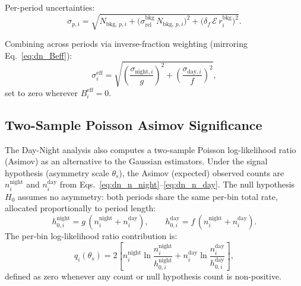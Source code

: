 \documentclass[12pt,a4paper]{article}
\newcommand{\Ecal}{\mathcal{E}}          %
\newcommand{\fd}{f}                      %
\newcommand{\fn}{g}                      %
\newcommand{\Beff}{B^{\mathrm{eff}}_{i}} %
\newcommand{\seff}{\sigma^{\mathrm{eff}}_{i}} %
\newcommand{\srel}{\sigma_{\mathrm{rel}}}
\begin{document}
Per-period uncertainties:
\begin{equation}
  \sigma_{p,i}
  = \sqrt{N_{\mathrm{bkg},\,p,i}
          + \bigl(\srel^{\mathrm{bkg}}\,N_{\mathrm{bkg},\,p,i}\bigr)^2
          + \bigl(\delta_f\,\Ecal\,r_i^{\mathrm{bkg}}\bigr)^2}.
  \label{eq:dn_sigma_period}
\end{equation}

Combining across periods via inverse-fraction weighting (mirroring
Eq.~\eqref{eq:dn_Beff}):
\begin{equation}
  \seff =
  \sqrt{\left(\frac{\sigma_{\mathrm{night},i}}{\fn}\right)^{\!2}
       +\left(\frac{\sigma_{\mathrm{day},i}}{\fd}\right)^{\!2}},
  \label{eq:dn_sigma_eff}
\end{equation}
set to zero wherever $\Beff = 0$.

\subsection{Two-Sample Poisson Asimov Significance}
\label{sec:dn_asimov}

The Day-Night analysis also computes a two-sample Poisson log-likelihood
ratio (Asimov) as an alternative to the Gaussian estimators.
Under the signal hypothesis (asymmetry scale $\theta_s$), the Asimov
(expected) observed counts are $n_i^{\mathrm{night}}$ and
$n_i^{\mathrm{day}}$ from Eqs.~\eqref{eq:dn_n_night}--\eqref{eq:dn_n_day}.
The null hypothesis $H_0$ assumes no asymmetry: both periods share the same
per-bin total rate, allocated proportionally to period length:
\begin{equation}
  h_{0,i}^{\mathrm{night}} = \fn\,(n_i^{\mathrm{night}} + n_i^{\mathrm{day}}),
  \qquad
  h_{0,i}^{\mathrm{day}}   = \fd\,(n_i^{\mathrm{night}} + n_i^{\mathrm{day}}).
  \label{eq:dn_h0}
\end{equation}
The per-bin log-likelihood ratio contribution is:
\begin{equation}
  q_i(\theta_s)
  = 2\!\left[
    n_i^{\mathrm{night}}\ln\frac{n_i^{\mathrm{night}}}{h_{0,i}^{\mathrm{night}}}
    +
    n_i^{\mathrm{day}}\ln\frac{n_i^{\mathrm{day}}}{h_{0,i}^{\mathrm{day}}}
  \right],
  \label{eq:dn_llr_bin}
\end{equation}
defined as zero whenever any count or null hypothesis count is non-positive.
\end{document}
